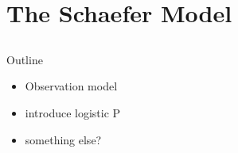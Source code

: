 \documentclass[ xcolor = pdftex, dvipsnames, table ]{beamer}
\begin{document}

%
\section{The Schaefer Model}
\subsection{}
\begin{frame}{Outline}
\end{frame}

%
\begin{frame}
\begin{itemize}
\color{red}
\item Observation model
\item introduce logistic P
\item something else?
\end{itemize}
\end{frame}
\end{document}
